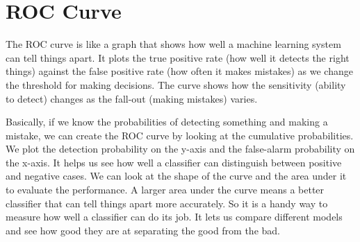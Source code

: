 \section{ROC Curve}
The ROC curve is like a graph that shows how well a machine learning system can tell things apart. It plots the true positive rate (how well it detects the right things) against the false positive rate (how often it makes mistakes) as we change the threshold for making decisions. The curve shows how the sensitivity (ability to detect) changes as the fall-out (making mistakes) varies.

Basically, if we know the probabilities of detecting something and making a mistake, we can create the ROC curve by looking at the cumulative probabilities. We plot the detection probability on the y-axis and the false-alarm probability on the x-axis.
It helps us see how well a classifier can distinguish between positive and negative cases. We can look at the shape of the curve and the area under it to evaluate the performance. A larger area under the curve means a better classifier that can tell things apart more accurately.
So it is a handy way to measure how well a classifier can do its job. It lets us compare different models and see how good they are at separating the good from the bad.

